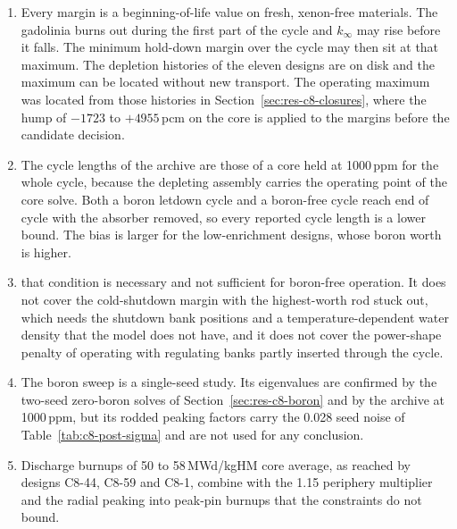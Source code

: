 \begin{enumerate}
  \item Every margin is a beginning-of-life value on fresh, xenon-free
        materials. The gadolinia burns out during the first part of the
        cycle and $k_\infty$ may rise before it falls. The minimum
        hold-down margin over the cycle may then sit at that maximum. The
        depletion histories of the eleven designs are on disk and the
        maximum can be located without new transport.
        The operating maximum was located from those histories in
        Section~\ref{sec:res-c8-closures}, where the hump of $-1723$ to
        $+4955$\,pcm on the core is applied to the margins before the
        candidate decision.

  \item The cycle lengths of the archive are those of a core held at
        1000\,ppm for the whole cycle, because the depleting assembly
        carries the operating point of the core solve. Both a boron
        letdown cycle and a boron-free cycle reach end of cycle with the
        absorber removed, so every reported cycle length is a lower bound.
        The bias is larger for the low-enrichment designs, whose boron
        worth is higher.

  \item that condition is necessary and not
        sufficient for boron-free operation. It does not cover the
        cold-shutdown margin with the highest-worth rod stuck out, which
        needs the shutdown bank positions and a temperature-dependent
        water density that the model does not have, and it does not cover
        the power-shape penalty of operating with regulating banks
        partly inserted through the cycle.

  \item The boron sweep is a single-seed study. Its eigenvalues are
        confirmed by the two-seed zero-boron solves of
        Section~\ref{sec:res-c8-boron} and by the
        archive at 1000\,ppm, but its rodded peaking factors carry the
        0.028 seed noise of Table~\ref{tab:c8-post-sigma} and are not
        used for any conclusion.

  \item Discharge burnups of 50 to 58\,MWd/kgHM core average, as reached
        by designs C8-44, C8-59 and C8-1, combine with the 1.15 periphery
        multiplier and the radial peaking into peak-pin burnups that the
        constraints do not bound.
\end{enumerate}

